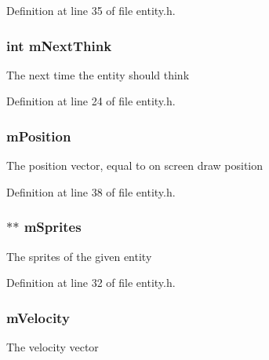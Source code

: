 Definition at line 35 of file entity.\+h.

\subsubsection[{\texorpdfstring{m\+Next\+Think}{mNextThink}}]{\setlength{\rightskip}{0pt plus 5cm}int m\+Next\+Think}\hypertarget{structentity__s_a24bdc1525ed5bcbf2a8c7027c9e1db5f}{}\label{structentity__s_a24bdc1525ed5bcbf2a8c7027c9e1db5f}
The next time the entity should think 

Definition at line 24 of file entity.\+h.

\subsubsection[{\texorpdfstring{m\+Position}{mPosition}}]{ m\+Position}\hypertarget{structentity__s_af80cb24cef46274686528f461642ba50}{}\label{structentity__s_af80cb24cef46274686528f461642ba50}
The position vector, equal to on screen draw position 

Definition at line 38 of file entity.\+h.

\subsubsection[{\texorpdfstring{m\+Sprites}{mSprites}}]{$\ast$$\ast$ m\+Sprites}\hypertarget{structentity__s_ad454ff27c8d769254a727750ac38592f}{}\label{structentity__s_ad454ff27c8d769254a727750ac38592f}
The sprites of the given entity 

Definition at line 32 of file entity.\+h.

\subsubsection[{\texorpdfstring{m\+Velocity}{mVelocity}}]{ m\+Velocity}\hypertarget{structentity__s_ad3ee4f856561237cfaeb8af26759aec1}{}\label{structentity__s_ad3ee4f856561237cfaeb8af26759aec1}
The velocity vector 


